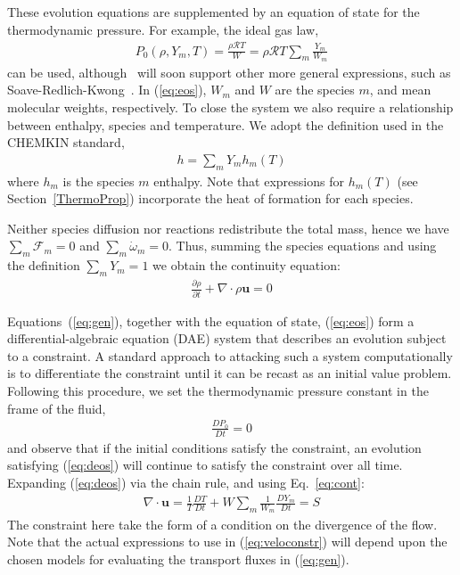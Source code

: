 These evolution equations are supplemented by an equation of state for the thermodynamic pressure.  For example, the ideal gas law,
\begin{eqnarray}
P_0(\rho,Y_m,T)=\frac{\rho \mathcal{R} T}{W}=\rho \mathcal{R} T \sum_m \frac{Y_m}{W_m}
\label{eq:eos}
\end{eqnarray}
can be used, although \pelelm\ will soon support other more general expressions, such as
Soave-Redlich-Kwong~\cite{Soave1972}.  In (\ref{eq:eos}), $W_m$ and $W$ are the species $m$, and mean
molecular weights, respectively.  To close the system
we also require a relationship between enthalpy, species and temperature.  We adopt the definition used in the CHEMKIN standard, 
\begin{eqnarray}
  h=\sum_m Y_m h_m(T)
  \label{eq:hofT}
\end{eqnarray}
where $h_m$ is the species $m$ enthalpy.  Note that expressions for $h_m(T)$ (see Section~\ref{ThermoProp}) incorporate the heat of formation for each species.

Neither species diffusion nor reactions redistribute the total mass, hence we have $\sum_m \boldsymbol{\mathcal{F}}_m = 0$ and $\sum_m \dot{\omega}_m = 0$. Thus, summing the species equations and using the definition $\sum_m Y_m = 1$ we obtain the continuity equation:
\begin{eqnarray}
\frac{\partial \rho}{\partial t} + \nabla \cdot \rho \boldsymbol{u} = 0
\label{eq:cont}
\end{eqnarray}

Equations~(\ref{eq:gen}), together with the equation of state, (\ref{eq:eos}) form a differential-algebraic equation (DAE) system that describes an evolution subject to a constraint.  A standard approach to attacking such a system computationally is to differentiate the constraint until it can be recast as an initial value problem.  Following this procedure, we set the thermodynamic pressure constant in the frame of the fluid,
\begin{eqnarray}
\frac{DP_0}{Dt} = 0
\label{eq:deos}
\end{eqnarray}
and observe that if the initial conditions satisfy the constraint, an evolution satisfying (\ref{eq:deos}) 
will continue to satisfy the constraint over all time.  Expanding (\ref{eq:deos}) via the chain rule, and using
Eq.~\ref{eq:cont}:
\begin{eqnarray}
\nabla \cdot \boldsymbol{u} = \frac{1}{T}\frac{DT}{Dt} + W \sum_m \frac{1}{W_m} \frac{DY_m}{Dt} = S
\label{eq:veloconstr}
\end{eqnarray}
The constraint here take the form of a condition on the divergence of the flow.  Note that the actual expressions to use in (\ref{eq:veloconstr}) will depend upon the chosen models for evaluating the transport fluxes in (\ref{eq:gen}).


